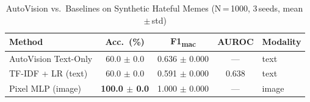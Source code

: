 \begin{table}[t]
\centering
\caption{AutoVision vs.\ Baselines on Synthetic Hateful Memes (N\,=\,1000, 3\,seeds, mean\,$\pm$\,std)}
\label{tab:hateful-memes}
\begin{tabular}{lcccl}
\toprule
Method & Acc.\ (\%) & F1\textsubscript{mac} & AUROC & Modality \\
\midrule
AutoVision Text-Only & 60.0 $\pm$ 0.0 & 0.636 $\pm$ 0.000 & --- & text \\
TF-IDF + LR (text) & 60.0 $\pm$ 0.0 & 0.591 $\pm$ 0.000 & 0.638 & text \\
Pixel MLP (image) & \textbf{100.0 $\pm$ 0.0} & 1.000 $\pm$ 0.000 & --- & image \\
\bottomrule
\end{tabular}
\end{table}
